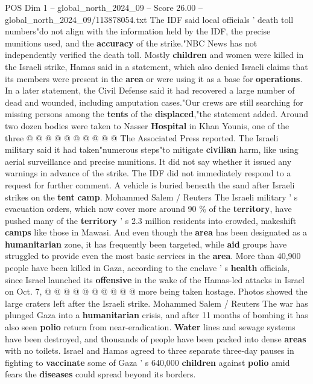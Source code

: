 \begin{textsample}{POS Dim 1 – global\_north\_2024\_09 – Score 26.00 – global\_north\_2024\_09/113878054.txt}
The IDF said local officials ' death toll numbers"do not align with the information held by the IDF, the precise munitions used, and the \textbf{accuracy} of the strike."NBC News has not independently verified the death toll.
Mostly \textbf{children} and women were killed in the Israeli strike, Hamas said in a statement, which also denied Israeli claims that its members were present in the \textbf{area} or were using it as a base for \textbf{operations}.
In a later statement, the Civil Defense said it had recovered a large number of dead and wounded, including amputation cases."Our crews are still searching for missing persons among the \textbf{tents} of the \textbf{displaced},"the statement added.
Around two dozen bodies were taken to Nasser \textbf{Hospital} in Khan Younis, one of the three @ @ @ @ @ @ @ @ @ @ The Associated Press reported.
The Israeli military said it had taken"numerous steps"to mitigate \textbf{civilian} harm, like using aerial surveillance and precise munitions.
It did not say whether it issued any warnings in advance of the strike.
The IDF did not immediately respond to a request for further comment.
A vehicle is buried beneath the sand after Israeli strikes on the \textbf{tent} \textbf{camp}.
Mohammed Salem / Reuters The Israeli military ' s evacuation orders, which now cover more around 90 \% of the \textbf{territory}, have pushed many of the \textbf{territory} ' s 2.3 million residents into crowded, makeshift \textbf{camps} like those in Mawasi.
And even though the \textbf{area} has been designated as a \textbf{humanitarian} zone, it has frequently been targeted, while \textbf{aid} groups have struggled to provide even the most basic services in the \textbf{area}.
More than 40,900 people have been killed in Gaza, according to the enclave ' s \textbf{health} officials, since Israel launched its \textbf{offensive} in the wake of the Hamas-led attacks in Israel on Oct. 7, @ @ @ @ @ @ @ @ @ @ more being taken hostage.
Photos showed the large craters left after the Israeli strike.
Mohammed Salem / Reuters The war has plunged Gaza into a \textbf{humanitarian} crisis, and after 11 months of bombing it has also seen \textbf{polio} return from near-eradication. \textbf{Water} lines and sewage systems have been destroyed, and thousands of people have been packed into dense \textbf{areas} with no toilets.
Israel and Hamas agreed to three separate three-day pauses in fighting to \textbf{vaccinate} some of Gaza ' s 640,000 \textbf{children} against \textbf{polio} amid fears the \textbf{diseases} could spread beyond its borders.

\end{textsample}
